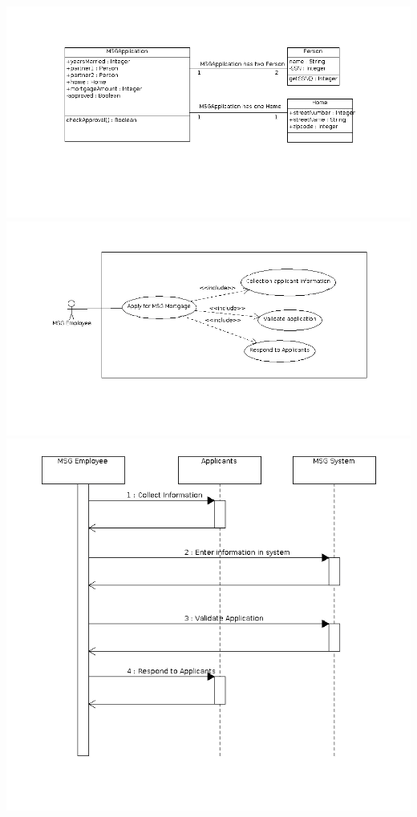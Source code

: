 \documentclass[12pt,letterpaper]{article}
\begin{document}
\begin{enumerate}
      \includegraphics[width=\textwidth]{hw1_part2_class.png}
      \includegraphics[width=\textwidth]{hw1_part2_use_case.png}
      \includegraphics[width=\textwidth]{hw1_part2_sequence.png}


\end{enumerate}
\end{document}
